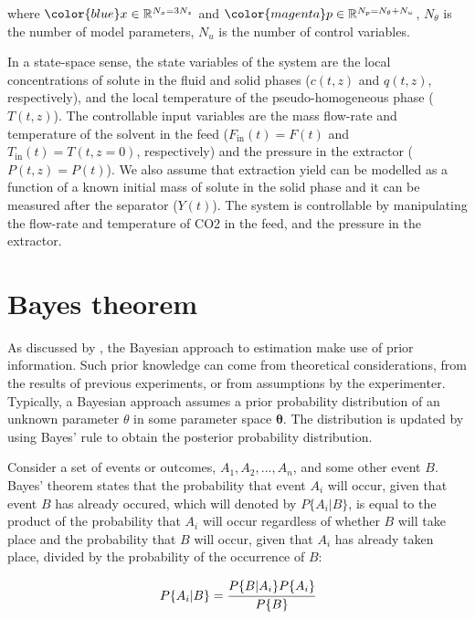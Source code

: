 \documentclass[a4paper,fleqn]{cas-dc}
\begin{document}
where ${\color{blue}x} \in \mathbb{R}^{N_x = 3N_z} $ and ${\color{magenta}p} \in \mathbb{R}^{N_p =  N_{\theta} + N_u } $, $N_{\theta}$ is the number of model parameters, $N_{u}$ is the number of control variables.

{\color{blue} In a state-space sense, the state variables of the system are the local concentrations of solute in the fluid and solid phases ($c(t,z)$ and $q(t,z)$, respectively), and the local temperature of the pseudo-homogeneous phase ($T(t,z)$). The controllable input variables are the mass flow-rate and temperature of the solvent in the feed ($F_\text{in}(t) = F(t)$ and $T_\text{in}(t) = T(t,z=0)$, respectively) and the pressure in the extractor ($P(t,z) = P(t)$). {\color{red}We also assume that extraction yield can be modelled as a function of a known initial mass of solute in the solid phase and it can be measured after the separator ($Y(t)$).} The system is controllable by manipulating the flow-rate and temperature of CO2 in the feed, and the pressure in the extractor. }

\newpage
\section{Bayes theorem} \label{CH: Bayes}

As discussed by \citet{Himmelblau1970}, the Bayesian approach to estimation make use of prior information. Such prior knowledge can come from theoretical considerations, from the results of previous experiments, or from assumptions by the experimenter. Typically, a Bayesian approach assumes a prior probability distribution of an unknown parameter $\theta$ in some parameter space $\boldsymbol{\theta}$. The distribution is updated by using Bayes' rule to obtain the posterior probability distribution. 

Consider a set of events or outcomes, $A_1,A_2,...,A_n$, and some other event $B$. Bayes' theorem states that the probability that event $A_i$ will occur, given that event $B$ has already occured, which will denoted by $P\{A_i|B\}$, is equal to the product of the probability that $A_i$ will occur regardless of whether $B$ will take place and the probability that $B$ will occur, given that $A_i$  has already taken place, divided by the probability of the occurrence of $B$:

{\footnotesize
\begin{equation}
	P\{A_i|B\} = \cfrac{P\{B|A_i\}P\{A_i\}}{P\{B\}}
\end{equation} }
\end{document}
